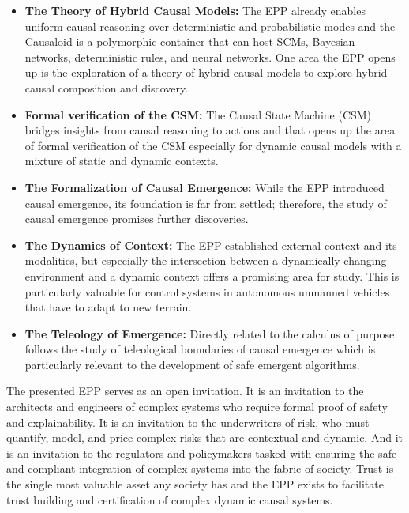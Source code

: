 \begin{itemize}
	\item \textbf{The Theory of Hybrid Causal Models:} The EPP already enables uniform causal reasoning over deterministic and probabilistic modes and the Causaloid is a polymorphic container that can host SCMs, Bayesian networks, deterministic rules, and neural networks. One area the EPP opens up is the exploration of a theory of hybrid causal models to explore hybrid causal composition and discovery.    
	\item \textbf{Formal verification of the CSM:} The Causal State Machine (CSM) bridges insights from causal reasoning to actions and that opens up the area of formal verification of the CSM especially for dynamic causal models with a mixture of static and dynamic contexts.  	
	\item \textbf{The Formalization of Causal Emergence:} While the EPP introduced causal emergence, its foundation is far from settled; therefore, the study of causal emergence promises further discoveries.
	\item \textbf{The Dynamics of Context:} The EPP established external context and its modalities, but especially the intersection between a dynamically changing environment and a dynamic context offers a promising area for study. This is particularly valuable for control systems in autonomous unmanned vehicles that have to adapt to new terrain. 
	\item \textbf{The Teleology of Emergence:} Directly related to the calculus of purpose follows the study of teleological boundaries of causal emergence which is particularly relevant to the development of safe emergent algorithms. 
\end{itemize}


The presented EPP serves as an open invitation. It is an invitation to the architects and engineers of complex systems who require formal proof of safety and explainability. It is an invitation to the underwriters of risk, who must quantify, model, and price complex risks that are contextual and dynamic. And it is an invitation to the regulators and policymakers tasked with ensuring the safe and compliant integration of complex systems into the fabric of society. Trust is the single most valuable asset any society has and the EPP exists to facilitate trust building and certification of complex dynamic causal systems. 

\newpage
